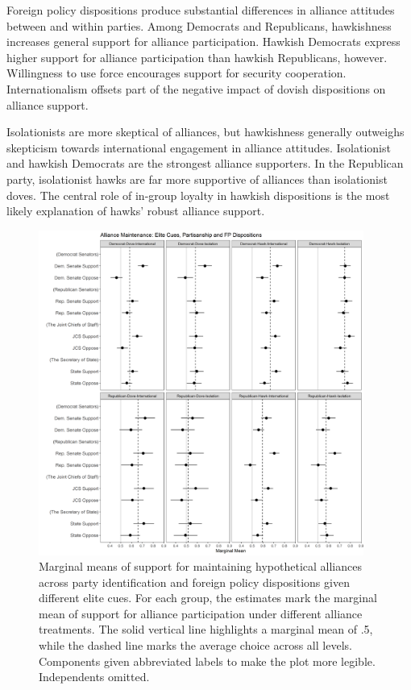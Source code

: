 \documentclass[12pt]{article}
\begin{document}
Foreign policy dispositions produce substantial differences in alliance attitudes between and within parties. 
Among Democrats and Republicans, hawkishness increases general support for alliance participation.
Hawkish Democrats express higher support for alliance participation than hawkish Republicans, however. 
Willingness to use force encourages support for security cooperation. 
Internationalism offsets part of the negative impact of dovish dispositions on alliance support. 


Isolationists are more skeptical of alliances, but hawkishness generally outweighs skepticism towards international engagement in alliance attitudes. 
Isolationist and hawkish Democrats are the strongest alliance supporters. 
In the Republican party, isolationist hawks are far more supportive of alliances than isolationist doves.
The central role of in-group loyalty in hawkish dispositions \citep{Kertzeretal2014} is the most likely explanation of hawks' robust alliance support. 


\begin{figure}
	\centering
		\includegraphics[width=0.95\textwidth]{../figures/party-dispo-main-el.png}
	\caption{Marginal means of support for maintaining hypothetical alliances across party identification and foreign policy dispositions given different elite cues. For each group, the estimates mark the marginal mean of support for alliance participation under different alliance treatments. The solid vertical line highlights a marginal mean of .5, while the dashed line marks the average choice across all levels. Components given abbreviated labels to make the plot more legible. Independents omitted.}
	\label{fig:party-dispo-main-el}
\end{figure}
\end{document}
